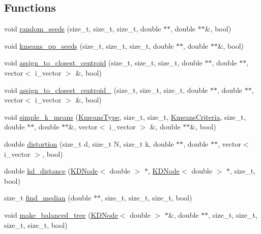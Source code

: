 \subsection*{Functions}
\begin{DoxyCompactItemize}
\item 
void \hyperlink{namespaceSimpleCluster_aa3c1fa27364305d35f14eb0b6b984a10}{random\+\_\+seeds} (size\+\_\+t, size\+\_\+t, size\+\_\+t, double $\ast$$\ast$, double $\ast$$\ast$\&, bool)
\item 
void \hyperlink{namespaceSimpleCluster_ab1abfee692e0476f34c72ac18a68bf17}{kmeans\+\_\+pp\+\_\+seeds} (size\+\_\+t, size\+\_\+t, size\+\_\+t, double $\ast$$\ast$, double $\ast$$\ast$\&, bool)
\item 
void \hyperlink{namespaceSimpleCluster_aca74ac04af2feab94c72dcfe7a26fd9f}{assign\+\_\+to\+\_\+closest\+\_\+centroid} (size\+\_\+t, size\+\_\+t, size\+\_\+t, double $\ast$$\ast$, double $\ast$$\ast$, vector$<$ i\+\_\+vector $>$ \&, bool)
\item 
void \hyperlink{namespaceSimpleCluster_af66bb5dcaeacf5d9a3856fbf793115d5}{assign\+\_\+to\+\_\+closest\+\_\+centroid\+\_} (size\+\_\+t, size\+\_\+t, size\+\_\+t, double $\ast$$\ast$, double $\ast$$\ast$, vector$<$ i\+\_\+vector $>$ \&, bool)
\item 
void \hyperlink{namespaceSimpleCluster_ab12576ad548dd6a6d0ba093c3a637abb}{simple\+\_\+k\+\_\+means} (\hyperlink{namespaceSimpleCluster_a8a8f57121b69a7b43575e4d6a53928e2}{Kmeans\+Type}, size\+\_\+t, size\+\_\+t, \hyperlink{structSimpleCluster_1_1KmeansCriteria}{Kmeans\+Criteria}, size\+\_\+t, double $\ast$$\ast$, double $\ast$$\ast$\&, vector$<$ i\+\_\+vector $>$ \&, double $\ast$$\ast$\&, bool)
\item 
double \hyperlink{namespaceSimpleCluster_a2b5ed423662d1968e1af5262812d7ca8}{distortion} (size\+\_\+t d, size\+\_\+t N, size\+\_\+t k, double $\ast$$\ast$, double $\ast$$\ast$, vector$<$ i\+\_\+vector $>$, bool)
\item 
double \hyperlink{namespaceSimpleCluster_a35cd22686dbc96142da1962ac88caaed}{kd\+\_\+distance} (\hyperlink{classSimpleCluster_1_1KDNode}{K\+D\+Node}$<$ double $>$ $\ast$, \hyperlink{classSimpleCluster_1_1KDNode}{K\+D\+Node}$<$ double $>$ $\ast$, size\+\_\+t, bool)
\item 
size\+\_\+t \hyperlink{namespaceSimpleCluster_aac5892d8292ef724345d8c422519ae05}{find\+\_\+median} (double $\ast$$\ast$, size\+\_\+t, size\+\_\+t, size\+\_\+t, bool)
\item 
void \hyperlink{namespaceSimpleCluster_a9b7733dc2edec70ad323beb9f3a9143e}{make\+\_\+balanced\+\_\+tree} (\hyperlink{classSimpleCluster_1_1KDNode}{K\+D\+Node}$<$ double $>$ $\ast$\&, double $\ast$$\ast$, size\+\_\+t, size\+\_\+t, size\+\_\+t, size\+\_\+t, bool)
$$
\end{DoxyCompactItemize}
